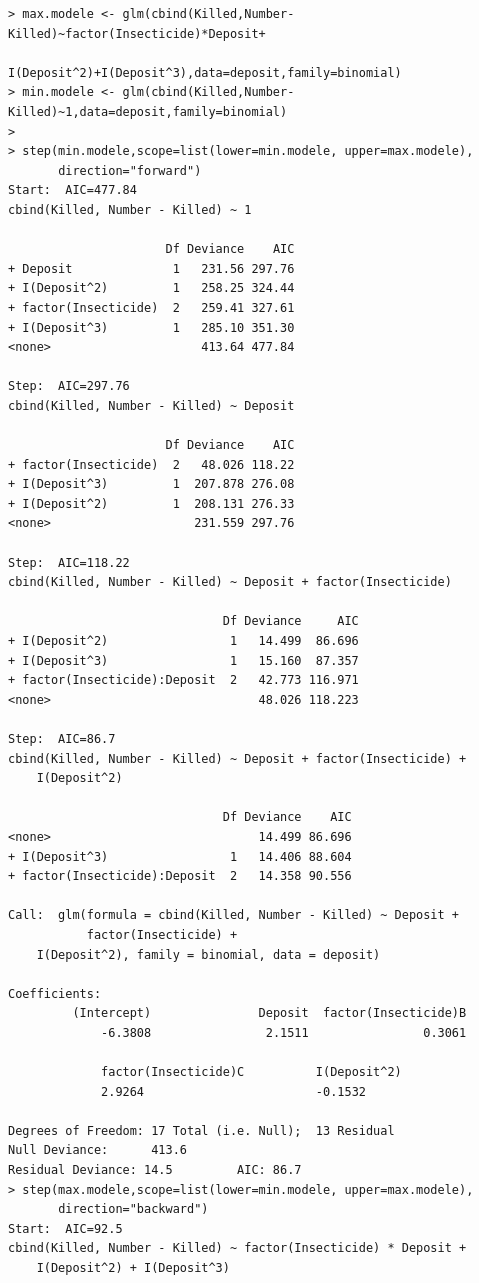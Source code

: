 \documentclass[11pt]{article}
\begin{document}
\begin{verbatim}
> max.modele <- glm(cbind(Killed,Number-Killed)~factor(Insecticide)*Deposit+
                    I(Deposit^2)+I(Deposit^3),data=deposit,family=binomial)
> min.modele <- glm(cbind(Killed,Number-Killed)~1,data=deposit,family=binomial)
> 
> step(min.modele,scope=list(lower=min.modele, upper=max.modele),
       direction="forward")
Start:  AIC=477.84
cbind(Killed, Number - Killed) ~ 1

                      Df Deviance    AIC
+ Deposit              1   231.56 297.76
+ I(Deposit^2)         1   258.25 324.44
+ factor(Insecticide)  2   259.41 327.61
+ I(Deposit^3)         1   285.10 351.30
<none>                     413.64 477.84

Step:  AIC=297.76
cbind(Killed, Number - Killed) ~ Deposit

                      Df Deviance    AIC
+ factor(Insecticide)  2   48.026 118.22
+ I(Deposit^3)         1  207.878 276.08
+ I(Deposit^2)         1  208.131 276.33
<none>                    231.559 297.76

Step:  AIC=118.22
cbind(Killed, Number - Killed) ~ Deposit + factor(Insecticide)

                              Df Deviance     AIC
+ I(Deposit^2)                 1   14.499  86.696
+ I(Deposit^3)                 1   15.160  87.357
+ factor(Insecticide):Deposit  2   42.773 116.971
<none>                             48.026 118.223

Step:  AIC=86.7
cbind(Killed, Number - Killed) ~ Deposit + factor(Insecticide) + 
    I(Deposit^2)

                              Df Deviance    AIC
<none>                             14.499 86.696
+ I(Deposit^3)                 1   14.406 88.604
+ factor(Insecticide):Deposit  2   14.358 90.556

Call:  glm(formula = cbind(Killed, Number - Killed) ~ Deposit +
           factor(Insecticide) + 
    I(Deposit^2), family = binomial, data = deposit)

Coefficients:
         (Intercept)               Deposit  factor(Insecticide)B  
             -6.3808                2.1511                0.3061                
             
             factor(Insecticide)C          I(Deposit^2)  
             2.9264                        -0.1532  

Degrees of Freedom: 17 Total (i.e. Null);  13 Residual
Null Deviance:      413.6 
Residual Deviance: 14.5         AIC: 86.7
> step(max.modele,scope=list(lower=min.modele, upper=max.modele),
       direction="backward")
Start:  AIC=92.5
cbind(Killed, Number - Killed) ~ factor(Insecticide) * Deposit + 
    I(Deposit^2) + I(Deposit^3)


\end{verbatim}
\end{document}
